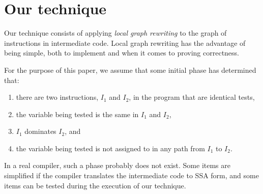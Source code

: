 \section{Our technique}

Our technique consists of applying \emph{local graph rewriting} to the
graph of instructions in intermediate code.  Local graph rewriting has
the advantage of being simple, both to implement and when it comes to
proving correctness.

For the purpose of this paper, we assume that some initial phase has
determined that:

\begin{enumerate}
\item there are two instructions, $I_1$ and $I_2$, in the program that
  are identical tests,
\item the variable being tested is the same in $I_1$ and $I_2$,
\item $I_1$ dominates $I_2$, and
\item the variable being tested is not assigned to in any path from
  $I_1$ to $I_2$.
\end{enumerate}

In a real compiler, such a phase probably does not exist.  Some items
are simplified if the compiler translates the intermediate code to SSA
form, and some items can be tested during the execution of our
technique.
